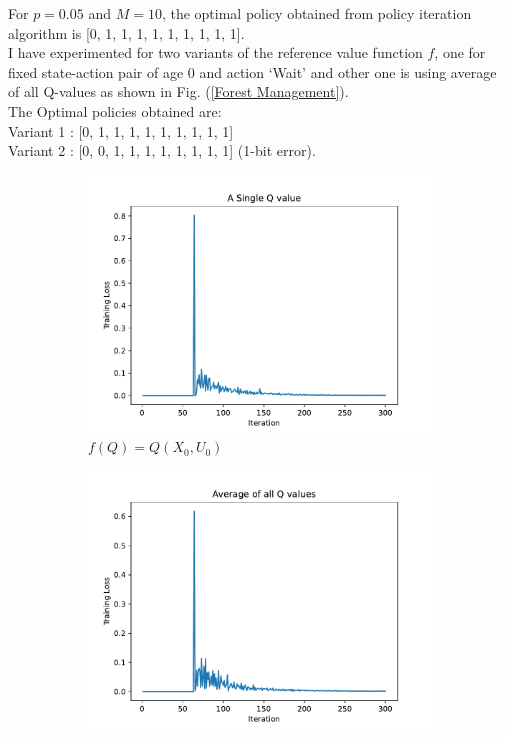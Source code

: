 \documentclass{article}
\theoremstyle{definition}
\begin{document}
For $p=0.05$ and $M=10$, the optimal policy obtained from policy iteration algorithm is [0, 1, 1, 1, 1, 1, 1, 1, 1, 1].\\
I have experimented for two variants of the reference value function $f$, one for fixed state-action pair of age 0 and action `Wait' and other one is using average of all Q-values as shown in Fig. (\ref{Forest Management}). \\
The Optimal policies obtained are:\\
Variant 1 : [0, 1, 1, 1, 1, 1, 1, 1, 1, 1]\\
Variant 2 : [0, 0, 1, 1, 1, 1, 1, 1, 1, 1] (1-bit error).
\begin{figure}[H]
     \captionsetup[subfigure]{justification=centering}
     \centering
     \begin{subfigure}{0.48\linewidth}
         \centering
         \includegraphics[width=1\linewidth]{variant1.pdf}
         \caption*{$f(Q) = Q(X_0,U_0)$}
         \label{}
     \end{subfigure}
     \begin{subfigure}{0.48\linewidth}
         \centering
         \includegraphics[width=1\linewidth]{variant2.pdf}

\end{subfigure}
\end{figure}
\end{document}

